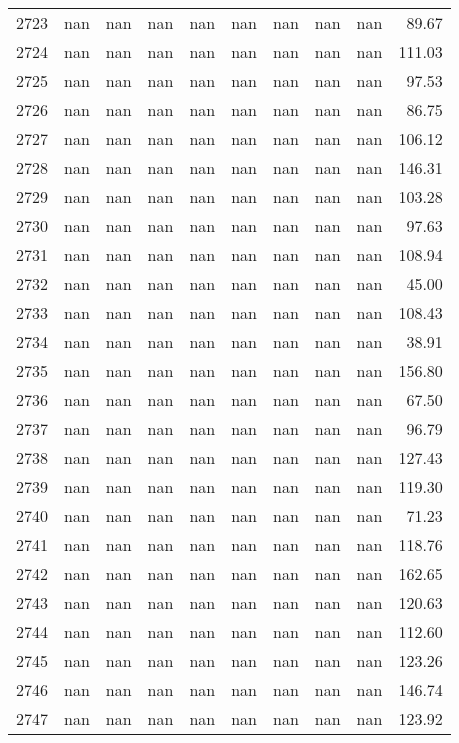 \begin{tabular}{lrrrrrrrrr}
2723 & nan & nan & nan & nan & nan & nan & nan & nan & 89.67 \\
2724 & nan & nan & nan & nan & nan & nan & nan & nan & 111.03 \\
2725 & nan & nan & nan & nan & nan & nan & nan & nan & 97.53 \\
2726 & nan & nan & nan & nan & nan & nan & nan & nan & 86.75 \\
2727 & nan & nan & nan & nan & nan & nan & nan & nan & 106.12 \\
2728 & nan & nan & nan & nan & nan & nan & nan & nan & 146.31 \\
2729 & nan & nan & nan & nan & nan & nan & nan & nan & 103.28 \\
2730 & nan & nan & nan & nan & nan & nan & nan & nan & 97.63 \\
2731 & nan & nan & nan & nan & nan & nan & nan & nan & 108.94 \\
2732 & nan & nan & nan & nan & nan & nan & nan & nan & 45.00 \\
2733 & nan & nan & nan & nan & nan & nan & nan & nan & 108.43 \\
2734 & nan & nan & nan & nan & nan & nan & nan & nan & 38.91 \\
2735 & nan & nan & nan & nan & nan & nan & nan & nan & 156.80 \\
2736 & nan & nan & nan & nan & nan & nan & nan & nan & 67.50 \\
2737 & nan & nan & nan & nan & nan & nan & nan & nan & 96.79 \\
2738 & nan & nan & nan & nan & nan & nan & nan & nan & 127.43 \\
2739 & nan & nan & nan & nan & nan & nan & nan & nan & 119.30 \\
2740 & nan & nan & nan & nan & nan & nan & nan & nan & 71.23 \\
2741 & nan & nan & nan & nan & nan & nan & nan & nan & 118.76 \\
2742 & nan & nan & nan & nan & nan & nan & nan & nan & 162.65 \\
2743 & nan & nan & nan & nan & nan & nan & nan & nan & 120.63 \\
2744 & nan & nan & nan & nan & nan & nan & nan & nan & 112.60 \\
2745 & nan & nan & nan & nan & nan & nan & nan & nan & 123.26 \\
2746 & nan & nan & nan & nan & nan & nan & nan & nan & 146.74 \\
2747 & nan & nan & nan & nan & nan & nan & nan & nan & 123.92 \\

\end{tabular}
